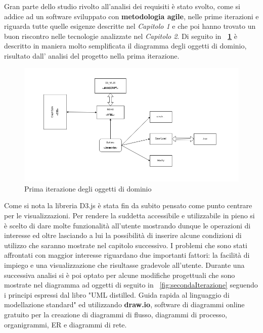 {Gran parte dello studio rivolto all'analisi dei requisiti \`e stato svolto, come si addice ad un software sviluppato con \textbf{metodologia agile}, nelle prime iterazioni e riguarda tutte quelle esigenze descritte nel \textit{Capitolo 1} e che poi hanno trovato un buon riscontro nelle tecnologie analizzate nel \textit{Capitolo 2}. Di seguito in \textbf{\figurename~\ref{fig:primaIterazione}}
\`e descritto in maniera molto semplificata il diagramma degli oggetti di dominio, risultato dall' analisi del progetto nella prima iterazione.
\begin{figure}[!htb]
	\begin{center}
		\hspace{-3.5 cm}
		\includegraphics[width=1.2 \linewidth]{figure/primaIterazione}
	\end{center}
	\caption{Prima iterazione degli oggetti di dominio\label{fig:primaIterazione}}
\end{figure}
Come si nota la libreria D3.js è stata fin da subito pensato come punto centrare per le visualizzazioni. Per rendere la suddetta accessibile e utilizzabile in pieno si \`e scelto di dare molte funzionalità all'utente mostrando dunque le operazioni di interesse ed oltre lasciando a lui la possibilità di inserire alcune condizioni di utilizzo che saranno mostrate nel capitolo successivo. I problemi che sono stati affrontati con maggior interesse riguardano due importanti fattori: la facilit\`a di impiego e una visualizzazione che risultasse gradevole all'utente.
Durante una successiva analisi si \`e poi optato per alcune modifiche progettuali che sono mostrate nel diagramma ad oggetti di seguito in \figurename~\ref{fig:secondaIterazione} seguendo i principi espressi dal libro "UML distilled. Guida rapida al linguaggio di modellazione standard"\cite{UML:10} ed utilizzando \textbf{draw.io}, software di diagrammi online gratuito per la creazione di diagrammi di flusso, diagrammi di processo, organigrammi, ER e diagrammi di rete.
}
